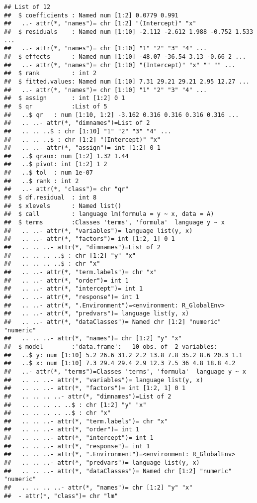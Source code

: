 \documentclass[
]{article}
\begin{document}
\begin{verbatim}
## List of 12
##  $ coefficients : Named num [1:2] 0.0779 0.991
##   ..- attr(*, "names")= chr [1:2] "(Intercept)" "x"
##  $ residuals    : Named num [1:10] -2.112 -2.612 1.988 -0.752 1.533 ...
##   ..- attr(*, "names")= chr [1:10] "1" "2" "3" "4" ...
##  $ effects      : Named num [1:10] -48.07 -36.54 3.13 -0.66 2 ...
##   ..- attr(*, "names")= chr [1:10] "(Intercept)" "x" "" "" ...
##  $ rank         : int 2
##  $ fitted.values: Named num [1:10] 7.31 29.21 29.21 2.95 12.27 ...
##   ..- attr(*, "names")= chr [1:10] "1" "2" "3" "4" ...
##  $ assign       : int [1:2] 0 1
##  $ qr           :List of 5
##   ..$ qr   : num [1:10, 1:2] -3.162 0.316 0.316 0.316 0.316 ...
##   .. ..- attr(*, "dimnames")=List of 2
##   .. .. ..$ : chr [1:10] "1" "2" "3" "4" ...
##   .. .. ..$ : chr [1:2] "(Intercept)" "x"
##   .. ..- attr(*, "assign")= int [1:2] 0 1
##   ..$ qraux: num [1:2] 1.32 1.44
##   ..$ pivot: int [1:2] 1 2
##   ..$ tol  : num 1e-07
##   ..$ rank : int 2
##   ..- attr(*, "class")= chr "qr"
##  $ df.residual  : int 8
##  $ xlevels      : Named list()
##  $ call         : language lm(formula = y ~ x, data = A)
##  $ terms        :Classes 'terms', 'formula'  language y ~ x
##   .. ..- attr(*, "variables")= language list(y, x)
##   .. ..- attr(*, "factors")= int [1:2, 1] 0 1
##   .. .. ..- attr(*, "dimnames")=List of 2
##   .. .. .. ..$ : chr [1:2] "y" "x"
##   .. .. .. ..$ : chr "x"
##   .. ..- attr(*, "term.labels")= chr "x"
##   .. ..- attr(*, "order")= int 1
##   .. ..- attr(*, "intercept")= int 1
##   .. ..- attr(*, "response")= int 1
##   .. ..- attr(*, ".Environment")=<environment: R_GlobalEnv> 
##   .. ..- attr(*, "predvars")= language list(y, x)
##   .. ..- attr(*, "dataClasses")= Named chr [1:2] "numeric" "numeric"
##   .. .. ..- attr(*, "names")= chr [1:2] "y" "x"
##  $ model        :'data.frame':   10 obs. of  2 variables:
##   ..$ y: num [1:10] 5.2 26.6 31.2 2.2 13.8 7.8 35.2 8.6 20.3 1.1
##   ..$ x: num [1:10] 7.3 29.4 29.4 2.9 12.3 7.5 36 4.8 18.8 4.2
##   ..- attr(*, "terms")=Classes 'terms', 'formula'  language y ~ x
##   .. .. ..- attr(*, "variables")= language list(y, x)
##   .. .. ..- attr(*, "factors")= int [1:2, 1] 0 1
##   .. .. .. ..- attr(*, "dimnames")=List of 2
##   .. .. .. .. ..$ : chr [1:2] "y" "x"
##   .. .. .. .. ..$ : chr "x"
##   .. .. ..- attr(*, "term.labels")= chr "x"
##   .. .. ..- attr(*, "order")= int 1
##   .. .. ..- attr(*, "intercept")= int 1
##   .. .. ..- attr(*, "response")= int 1
##   .. .. ..- attr(*, ".Environment")=<environment: R_GlobalEnv> 
##   .. .. ..- attr(*, "predvars")= language list(y, x)
##   .. .. ..- attr(*, "dataClasses")= Named chr [1:2] "numeric" "numeric"
##   .. .. .. ..- attr(*, "names")= chr [1:2] "y" "x"
##  - attr(*, "class")= chr "lm"
\end{verbatim}
\end{document}
